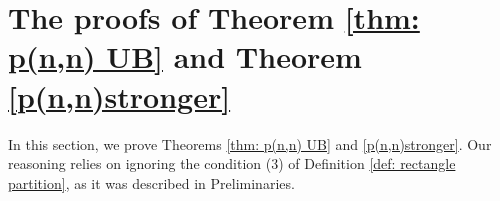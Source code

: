 \documentclass[12pt,a4paper]{amsart}
\numberwithin{equation}{section}
\theoremstyle{plain}
\theoremstyle{definition}
\theoremstyle{remark}
\newtheorem{re}[thm]{Remark}
\begin{document}

\section{The proofs of Theorem \ref{thm: p(n,n) UB} and Theorem \ref{p(n,n)stronger}}

In this section, we prove Theorems \ref{thm: p(n,n) UB} and \ref{p(n,n)stronger}. Our reasoning relies on ignoring the condition (3) of Definition \ref{def: rectangle partition}, as it was described in Preliminaries.
\end{document}
